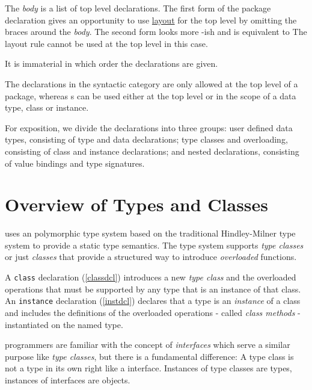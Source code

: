 
The \emph{body} is a list of top level declarations. The first form of the package declaration gives an opportunity to use \hyperref[layout]{layout} for the top level by omitting the braces around the \emph{body}. The second form 
looks more \java{}-ish and is equivalent to 
The layout rule cannot be used at the top level in this case.

It is immaterial in which order the declarations are given.

The declarations in the syntactic category  are only allowed at the top level of a \frege{} package, whereas s can be used either at the top level or in the scope of a data type, class or instance.

For exposition, we divide the declarations into three groups: user defined data types, consisting of type and data declarations; type classes and overloading, consisting of class and instance declarations; and nested declarations, consisting of value bindings and type signatures.

\section{Overview of Types and Classes}
\frege{} uses an polymorphic type system based on the traditional Hindley-Milner type system \cite{ptifart} to provide a static type semantics. The type system supports \emph{type classes} or just \emph{classes} that provide a structured way to introduce \emph{overloaded} functions.

A \texttt{class} declaration (\autoref{classdcl}) introduces a new \emph{type class} and the overloaded operations that must be supported by any type that is an instance of that class. An \texttt{instance} declaration (\autoref{instdcl}) declares that a type is an \emph{instance} of a class and includes the definitions of the overloaded operations - called \emph{class methods} - instantiated on the named type.  

\java{} programmers are familiar with the concept of \emph{interfaces} which serve a similar purpose like \emph{type classes}, but there is a fundamental difference: A \frege{} type class is not a type in its own right like a \java{} interface. Instances of type classes are types, instances of \java{} interfaces are objects.

